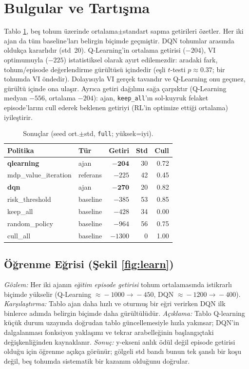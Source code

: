 \documentclass[conference]{IEEEtran}
\begin{document}
\section{Bulgular ve Tartışma}
\label{sec:results}
Tablo \ref{tab:results}, beş tohum üzerinde ortalama$\pm$standart sapma getirileri
özetler. Her iki ajan da tüm baseline'ları belirgin biçimde geçmiştir. DQN tohumlar
arasında oldukça kararlıdır (std~20). Q-Learning'in ortalama getirisi ($-204$), VI
optimumuyla ($-225$) istatistiksel olarak ayırt edilemezdir: aradaki fark, tohum/episode
değerlendirme gürültüsü içindedir (eşli $t$-testi $p\approx0.37$; bir tohumda VI öndedir).
Dolayısıyla VI gerçek tavandır ve Q-Learning onu geçmez, gürültü içinde ona ulaşır. Ayrıca
getiri dağılımı sağa çarpıktır (Q-Learning medyan $-556$, ortalama $-204$): ajan,
\texttt{keep\_all}'ın sol-kuyruk felaket episode'larını cull ederek beklenen getiriyi
(RL'in optimize ettiği ortalama) iyileştirir.

\begin{table}[t]
\caption{Sonuçlar (seed ort.$\pm$std, \texttt{full}; yüksek=iyi).}
\label{tab:results}
\centering\footnotesize
\begin{tabular}{@{}l l r r r@{}}
\toprule
Politika & Tür & Getiri & Std & Cull \\
\midrule
\textbf{qlearning} & ajan & $\mathbf{-204}$ & 30 & 0.72 \\
mdp\_value\_iteration & referans & $-225$ & 42 & 0.45 \\
\textbf{dqn} & ajan & $\mathbf{-270}$ & 20 & 0.82 \\
risk\_threshold & baseline & $-385$ & 53 & 0.85 \\
keep\_all & baseline & $-428$ & 34 & 0.00 \\
random\_policy & baseline & $-964$ & 56 & 0.75 \\
cull\_all & baseline & $-1300$ & 0 & 1.00 \\
\bottomrule
\end{tabular}
\end{table}

\subsection{Öğrenme Eğrisi (Şekil \ref{fig:learn})}
\emph{Gözlem:} Her iki ajanın \emph{eğitim episode getirisi} tohum ortalamasında istikrarlı
biçimde yükselir (Q-Learning $\approx\!-1000\!\to\!-450$, DQN $\approx\!-1200\!\to\!-400$).
\emph{Karşılaştırma:} Tablo ajan daha hızlı ve oturmuş bir eğri verirken DQN ilk binlerce
adımda belirgin biçimde daha gürültülüdür. \emph{Açıklama:} Tablo Q-learning küçük durum
uzayında doğrudan tablo güncellemesiyle hızla yakınsar; DQN'in dalgalanması fonksiyon
yaklaşımı ve tekrar arabelleğinin başlangıçtaki değişkenliğinden kaynaklanır.
\emph{Sonuç:} y-ekseni anlık ödül değil episode getirisi olduğu için öğrenme açıkça
görünür; gölgeli std bandı bunun tek şanslı bir koşu değil, beş tohumda sistematik bir
kazanım olduğunu doğrular.
\end{document}
